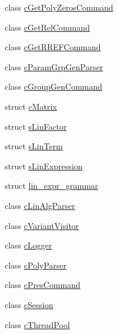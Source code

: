 \begin{DoxyCompactItemize}
\item 
class \hyperlink{classengine_1_1cGetPolyZerosCommand}{c\-Get\-Poly\-Zeros\-Command}
\item 
class \hyperlink{classengine_1_1cGetRelCommand}{c\-Get\-Rel\-Command}
\item 
class \hyperlink{classengine_1_1cGetRREFCommand}{c\-Get\-R\-R\-E\-F\-Command}
\item 
class \hyperlink{classengine_1_1cParamGrpGenParser}{c\-Param\-Grp\-Gen\-Parser}
\item 
class \hyperlink{classengine_1_1cGroupGenCommand}{c\-Group\-Gen\-Command}
\item 
struct \hyperlink{structengine_1_1cMatrix}{c\-Matrix}
\item 
struct \hyperlink{structengine_1_1sLinFactor}{s\-Lin\-Factor}
\item 
struct \hyperlink{structengine_1_1sLinTerm}{s\-Lin\-Term}
\item 
struct \hyperlink{structengine_1_1sLinExpression}{s\-Lin\-Expression}
\item 
struct \hyperlink{structengine_1_1lin__expr__grammar}{lin\-\_\-expr\-\_\-grammar}
\item 
class \hyperlink{classengine_1_1cLinAlgParser}{c\-Lin\-Alg\-Parser}
\item 
class \hyperlink{classengine_1_1cVariantVisitor}{c\-Variant\-Visitor}
\item 
class \hyperlink{classengine_1_1cLogger}{c\-Logger}
\item 
class \hyperlink{classengine_1_1cPolyParser}{c\-Poly\-Parser}
\item 
class \hyperlink{classengine_1_1cPresCommand}{c\-Pres\-Command}
\item 
class \hyperlink{classengine_1_1cSession}{c\-Session}
\item 
class \hyperlink{classengine_1_1cThreadPool}{c\-Thread\-Pool}
\end{DoxyCompactItemize}
